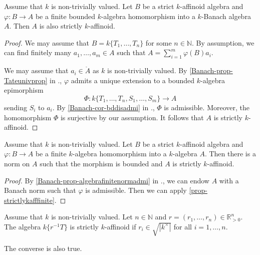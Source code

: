 \begin{proposition}\label{prop-strictlykafffinite}
    Assume that $k$ is non-trivially valued.
    Let $B$ be a strict $k$-affinoid algebra and $\varphi:B\rightarrow A$ be a finite bounded $k$-algebra homomorphism into a $k$-Banach algebra $A$. Then $A$ is also strictly $k$-affinoid.
\end{proposition}
\begin{proof}
    We may assume that $B=k\{T_1,\ldots,T_n\}$ for some $n\in \mathbb{N}$. By assumption, we can find finitely many $a_1,\ldots,a_m\in A$ such that $A=\sum_{i=1}^m \varphi(B)a_i$.

    We may assume that $a_i\in \mathring{A}$ as $k$ is non-trivially valued. By \cref{Banach-prop-Tateunivprop} in ., $\varphi$ admits a unique extension to a bounded $k$-algebra epimorphism 
    \[
        \Phi:  k\{T_1,\ldots,T_n,S_1,\ldots,S_m\}\rightarrow A
    \]
    sending $S_i$ to $a_i$. By \cref{Banach-cor-bddisadmi} in ., $\Phi$ is admissible. Moreover, the homomorphism $\Phi$ is surjective by our assumption. It follows that $A$ is strictly $k$-affinoid.
\end{proof}

\begin{proposition}\label{prop-finiteinduceaffnorm}
    Assume that $k$ is non-trivially valued.
    Let $B$ be a strict $k$-affinoid algebra and $\varphi:B\rightarrow A$ be a finite $k$-algebra homomorphism into a $k$-algebra $A$. Then there is a norm on $A$ such that the morphism is bounded and $A$ is strictly $k$-affinoid.
\end{proposition}
\begin{proof}
    By \cref{Banach-prop-algebrafinitenormadmi} in ., we can endow $A$ with a Banach norm such that $\varphi$ is admissible. Then we can apply \cref{prop-strictlykafffinite}.
\end{proof}

\begin{lemma}\label{lma-tatestrictaff}
    Assume that $k$ is non-trivially valued.
    Let $n\in \mathbb{N}$ and $r=(r_1,\ldots,r_n)\in \mathbb{R}^n_{>0}$. The algebra $k\{r^{-1}T\}$ is strictly $k$-affinoid if $r_i\in \sqrt{|k^{\times}|}$ for all $i=1,\ldots,n$.
\end{lemma}
\begin{remark}
    The converse is also true.     
\end{remark}


